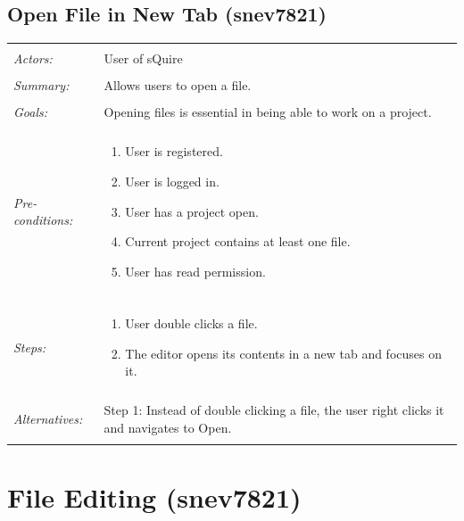 \documentclass[11pt]{report}
\begin{document}
\subsection{Open File in New Tab (snev7821)}
\begin{tabular}{ p{2cm} p{12cm} }
\hline
	\\
	\textit{Actors:} & User of sQuire \\
	\\
	\textit{Summary:} & Allows users to open a file. \\
	\\
	\textit{Goals:} & Opening files is essential in being able to work on a project. \\
	\\
	\textit{Pre-conditions:} &  \begin{enumerate}
		\item User is registered.
		\item User is logged in.
		\item User has a project open.
		\item Current project contains at least one file.
		\item User has read permission.
	\end{enumerate} \\
	\\
	\textit{Steps:} & \begin{enumerate}
		\item User double clicks a file.
		\item The editor opens its contents in a new tab and focuses on it.
	\end{enumerate} \\
	\\
	\textit{Alternatives:} & Step 1: Instead of double clicking a file, the user right clicks it and navigates to Open. \\
	\\
\hline
\end{tabular}
\newpage


\section{File Editing (snev7821)}
\end{document}
